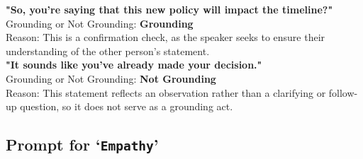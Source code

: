 \begin{tcolorbox}[title=Grounding Act Classification, myboxstyle, breakable]
\textbf{"So, you’re saying that this new policy will impact the timeline?"} \\
Grounding or Not Grounding: \textbf{Grounding} \\
Reason: This is a confirmation check, as the speaker seeks to ensure their understanding of the other person’s statement.\\

\textbf{"It sounds like you’ve already made your decision."} \\
Grounding or Not Grounding: \textbf{Not Grounding} \\
Reason: This statement reflects an observation rather than a clarifying or follow-up question, so it does not serve as a grounding act.
\end{tcolorbox}


\subsection{Prompt for `\texttt{Empathy}'}
\label{appendix:evaluation-empathy}

